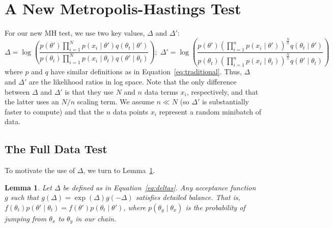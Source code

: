 \documentclass{article}
\newtheorem{lemma}{Lemma}
\begin{document}
\section{A New Metropolis-Hastings Test}\label{sec:our_algorithm}

For our new MH test, we use two key values, $\Delta$ and $\Delta'$:
\begin{equation}\label{eq:deltas}
\Delta = \log \left( \frac{p(\theta')  \prod_{i=1}^N p(x_i \mid \theta')  q(\theta_t \mid
\theta')}{p(\theta_t)\prod_{i=1}^N p(x_i \mid \theta_t)  q(\theta' \mid
\theta_t)} \right);\;  \Delta' = \log \left( \frac{p(\theta') (\prod_{i=1}^n p(x_i \mid
\theta'))^{\frac{N}{n}} q(\theta_t \mid \theta')}{p(\theta_t) (\prod_{i=1}^n p(x_i \mid
\theta_t))^{\frac{N}{n}} q(\theta' \mid \theta_t)} \right)
\end{equation}
where $p$ and $q$ have similar definitions as in Equation~\ref{eq:traditional}. Thus, $\Delta$ and
$\Delta'$ are the likelihood ratios in log space. Note that the only difference between $\Delta$ and
$\Delta'$ is that they use $N$ and $n$ data terms $x_i$, respectively, and that the latter uses an
$N/n$ scaling term. We assume $n \ll N$ (so $\Delta'$ is substantially faster to compute) and that
the $n$ data points $x_i$ represent a random minibatch of data.

\subsection{The Full Data Test}\label{ssec:deltas_full}

To motivate the use of $\Delta$, we turn to Lemma~\ref{lem:detailed_balance}.

\begin{lemma}\label{lem:detailed_balance}
Let $\Delta$ be defined as in Equation~\ref{eq:deltas}. Any acceptance function $g$ such that
$g(\Delta) = \exp(\Delta) g(-\Delta )$ satisfies detailed balance. That is, $f(\theta_t)p(\theta'
\mid \theta_t) = f(\theta')p(\theta_t \mid \theta')$, where $p(\theta_y \mid \theta_x)$ is the
probability of jumping from $\theta_x$ to $\theta_y$ in our chain.
\end{lemma}
\end{document}
